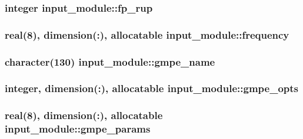 \subsubsection[{fp\+\_\+rup}]{\setlength{\rightskip}{0pt plus 5cm}integer input\+\_\+module\+::fp\+\_\+rup}\label{namespaceinput__module_a73158a89ce75123f19e014408bb9b342}
\hypertarget{namespaceinput__module_a2eec881a49e9f9d341e49f123b8435a3}{}
\subsubsection[{frequency}]{\setlength{\rightskip}{0pt plus 5cm}real(8), dimension(\+:), allocatable input\+\_\+module\+::frequency}\label{namespaceinput__module_a2eec881a49e9f9d341e49f123b8435a3}
\hypertarget{namespaceinput__module_ae241dcd6d1b9e390d39acb1f7ed2f38b}{}
\subsubsection[{gmpe\+\_\+name}]{\setlength{\rightskip}{0pt plus 5cm}character(130) input\+\_\+module\+::gmpe\+\_\+name}\label{namespaceinput__module_ae241dcd6d1b9e390d39acb1f7ed2f38b}
\hypertarget{namespaceinput__module_a1c956fb0e5942428da3bdb0c932fd10c}{}
\subsubsection[{gmpe\+\_\+opts}]{\setlength{\rightskip}{0pt plus 5cm}integer, dimension(\+:), allocatable input\+\_\+module\+::gmpe\+\_\+opts}\label{namespaceinput__module_a1c956fb0e5942428da3bdb0c932fd10c}
\hypertarget{namespaceinput__module_ab52a267c1d75b879ad598fa6cc377c4b}{}
\subsubsection[{gmpe\+\_\+params}]{\setlength{\rightskip}{0pt plus 5cm}real(8), dimension(\+:), allocatable input\+\_\+module\+::gmpe\+\_\+params}\label{namespaceinput__module_ab52a267c1d75b879ad598fa6cc377c4b}
\hypertarget{namespaceinput__module_af09923ed6808263d4497c13126abdb46}{}
